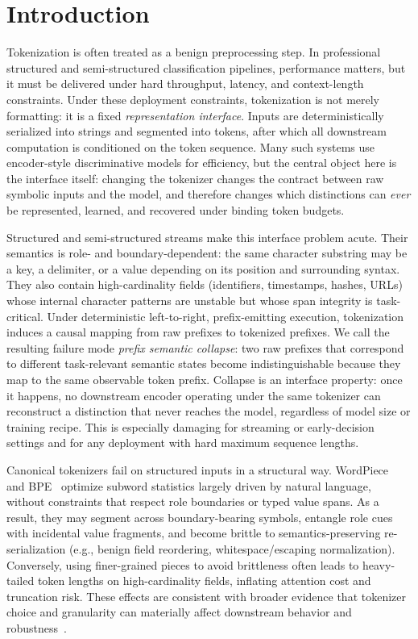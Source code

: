 \section{Introduction}
\label{sec:intro}

Tokenization is often treated as a benign preprocessing step.
In professional structured and semi-structured classification pipelines, performance matters, but it must be delivered under hard throughput, latency, and context-length constraints.
Under these deployment constraints, tokenization is not merely formatting: it is a fixed \emph{representation interface}.
Inputs are deterministically serialized into strings and segmented into tokens, after which all downstream computation is conditioned on the token sequence.
Many such systems use encoder-style discriminative models for efficiency, but the central object here is the interface itself: changing the tokenizer changes the contract between raw symbolic inputs and the model, and therefore changes which distinctions can \emph{ever} be represented, learned, and recovered under binding token budgets.

Structured and semi-structured streams make this interface problem acute.
Their semantics is role- and boundary-dependent: the same character substring may be a key, a delimiter, or a value depending on its position and surrounding syntax.
They also contain high-cardinality fields (identifiers, timestamps, hashes, URLs) whose internal character patterns are unstable but whose span integrity is task-critical.
Under deterministic left-to-right, prefix-emitting execution, tokenization induces a causal mapping from raw prefixes to tokenized prefixes.
We call the resulting failure mode \emph{prefix semantic collapse}: two raw prefixes that correspond to different task-relevant semantic states become indistinguishable because they map to the same observable token prefix.
Collapse is an interface property: once it happens, no downstream encoder operating under the same tokenizer can reconstruct a distinction that never reaches the model, regardless of model size or training recipe.
This is especially damaging for streaming or early-decision settings and for any deployment with hard maximum sequence lengths.

Canonical tokenizers fail on structured inputs in a structural way.
WordPiece~\cite{schuster2012japanese,wu2016gnmt} and BPE~\cite{gage1994new,sennrich2016neural} optimize subword statistics largely driven by natural language, without constraints that respect role boundaries or typed value spans.
As a result, they may segment across boundary-bearing symbols, entangle role cues with incidental value fragments, and become brittle to semantics-preserving re-serialization (e.g., benign field reordering, whitespace/escaping normalization).
Conversely, using finer-grained pieces to avoid brittleness often leads to heavy-tailed token lengths on high-cardinality fields, inflating attention cost and truncation risk.
These effects are consistent with broader evidence that tokenizer choice and granularity can materially affect downstream behavior and robustness~\cite{rust2021good,bostrom2020byte,mielke2021between}.

